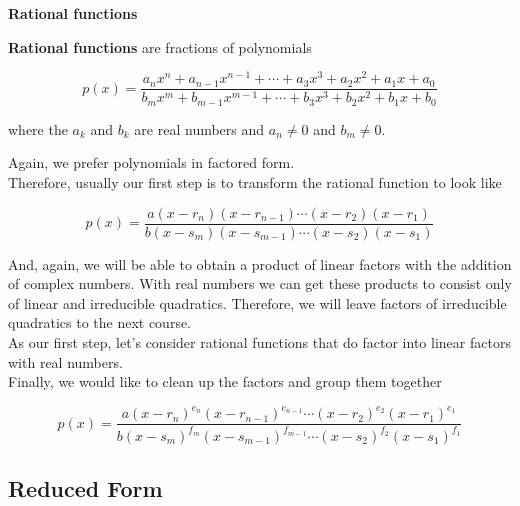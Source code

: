 \documentclass{ximera}
\begin{document}
\begin{definition} \item \textbf{\textcolor{green!50!black}{Rational functions}}


\textbf{Rational functions} are fractions of polynomials




\[ p(x) =   \frac{ a_n x^n + a_{n-1} x^{n-1} + \cdots + a_3 x^3 + a_2 x^2 + a_1 x + a_0  } { b_m x^m + b_{m-1} x^{m-1} + \cdots + b_3 x^3 + b_2 x^2 + b_1 x + b_0 }   \]



where the $a_k$ and $b_k$ are real numbers and $a_n \ne 0$ and $b_m \ne 0$.


\end{definition}





Again, we prefer polynomials in factored form.  \\


Therefore, usually our first step is to transform the rational function to look like



\[ p(x) =   \frac{ a (x-r_n)(x-r_{n-1})  \cdots (x-r_2)(x-r_1)  } { b (x-s_m)(x-s_{m-1})  \cdots (x-s_2)(x-s_1) }   \]




And, again, we will be able to obtain a product of linear factors with the addition of complex numbers.  With real numbers we can get these products to consist only of linear and irreducible quadratics.  Therefore, we will leave factors of irreducible quadratics to the next course. \\

As our first step, let's consider rational functions that do factor into linear factors with real numbers. \\




Finally, we would like to clean up the factors and group them together






\[ p(x) =   \frac{ a (x-r_n)^{e_n} (x-r_{n-1})^{e_{n-1}}  \cdots (x-r_2)^{e_2} (x-r_1)^{e_1}  } { b (x-s_m)^{f_m} (x-s_{m-1})^{f_{m-1}}  \cdots (x-s_2)^{f_2} (x-s_1)^{f_1} }   \]






\subsection*{Reduced Form}
\end{document}
